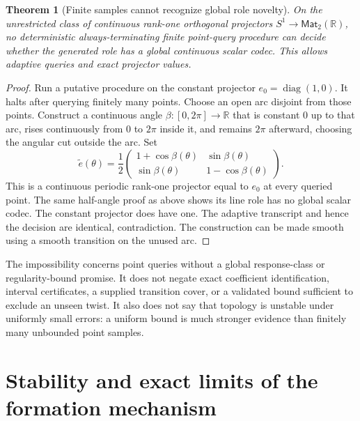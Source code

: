 \documentclass[11pt]{article}
\newtheorem{theorem}{Theorem}[section]
\theoremstyle{definition}
\theoremstyle{remark}
\newcommand{\R}{\mathbb R}
\newcommand{\Mat}{\mathsf{Mat}}
\begin{document}
\begin{theorem}[Finite samples cannot recognize global role novelty]\label{m-thm:no-samples}
On the unrestricted class of continuous rank-one orthogonal projectors $S^1\to\Mat_2(\R)$, no deterministic always-terminating finite point-query procedure can decide whether the generated role has a global continuous scalar codec. This allows adaptive queries and exact projector values.
\end{theorem}
\begin{proof}
Run a putative procedure on the constant projector $e_0=\operatorname{diag}(1,0)$. It halts after querying finitely many points. Choose an open arc disjoint from those points. Construct a continuous angle $\beta:[0,2\pi]\to\R$ that is constant $0$ up to that arc, rises continuously from $0$ to $2\pi$ inside it, and remains $2\pi$ afterward, choosing the angular cut outside the arc. Set
\[
 \widetilde e(\theta)=\frac12
 \begin{pmatrix}1+\cos\beta(\theta)&\sin\beta(\theta)\\
 \sin\beta(\theta)&1-\cos\beta(\theta)\end{pmatrix}.
\]
This is a continuous periodic rank-one projector equal to $e_0$ at every queried point. The same half-angle proof as above shows its line role has no global scalar codec. The constant projector does have one. The adaptive transcript and hence the decision are identical, contradiction. The construction can be made smooth using a smooth transition on the unused arc.
\end{proof}

The impossibility concerns point queries without a global response-class or regularity-bound promise. It does not negate exact coefficient identification, interval certificates, a supplied transition cover, or a validated bound sufficient to exclude an unseen twist. It also does not say that topology is unstable under uniformly small errors: a uniform bound is much stronger evidence than finitely many unbounded point samples.

\section{Stability and exact limits of the formation mechanism}
\end{document}
